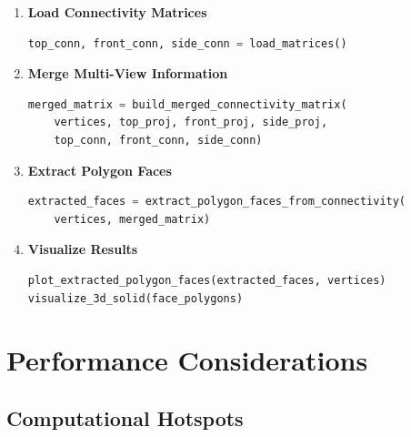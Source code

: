 \documentclass[11pt,a4paper]{article}
\begin{document}
\begin{enumerate}
    \item \textbf{Load Connectivity Matrices}
    \begin{lstlisting}[language=Python]
top_conn, front_conn, side_conn = load_matrices()
    \end{lstlisting}
    
    \item \textbf{Merge Multi-View Information}
    \begin{lstlisting}[language=Python]
merged_matrix = build_merged_connectivity_matrix(
    vertices, top_proj, front_proj, side_proj,
    top_conn, front_conn, side_conn)
    \end{lstlisting}
    
    \item \textbf{Extract Polygon Faces}
    \begin{lstlisting}[language=Python]
extracted_faces = extract_polygon_faces_from_connectivity(
    vertices, merged_matrix)
    \end{lstlisting}
    
    \item \textbf{Visualize Results}
    \begin{lstlisting}[language=Python]
plot_extracted_polygon_faces(extracted_faces, vertices)
visualize_3d_solid(face_polygons)
    \end{lstlisting}
\end{enumerate}

\newpage
\section{Performance Considerations}

\subsection{Computational Hotspots}
\end{document}
